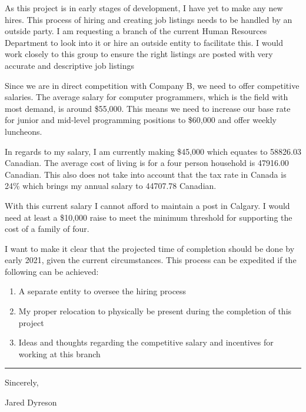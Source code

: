 \documentclass{article}
\begin{document}
As this project is in early stages of development, I have yet to make any new hires.
This process of hiring and creating job listings needs to be handled by an outside party.
I am requesting a branch of the current Human Resources Department to look into it or hire an outside entity to facilitate this.
I would work closely to this group to ensure the right listings are posted with very accurate and descriptive job listings

Since we are in direct competition with Company B, we need to offer competitive salaries.
The average salary for computer programmers, which is the field with most demand, is around \$55,000.
This means we need to increase our base rate for junior and mid-level programming positions to \$60,000 and offer weekly luncheons.

In regards to my salary, I am currently making \$45,000 which equates to 58826.03 Canadian. The average cost of living is for a four person household is 47916.00 Canadian.
This also does not take into account that the tax rate in Canada is 24\% which brings my annual salary to 44707.78 Canadian. 

With this current salary I cannot afford to maintain a post in Calgary. I would need at least a \$10,000 raise to meet the minimum threshold for supporting the cost of a family of four.

I want to make it clear that the projected time of completion should be done by early 2021, given the current circumstances.
This process can be expedited if the following can be achieved:

\begin{enumerate}
\item A separate entity to oversee the hiring process
\item My proper relocation to physically be present during the completion of this project
\item Ideas and thoughts regarding the competitive salary and incentives for working at this branch
\end{enumerate}

\par\noindent\rule{\textwidth}{0.4pt}

Sincerely,

Jared Dyreson
\end{document}
